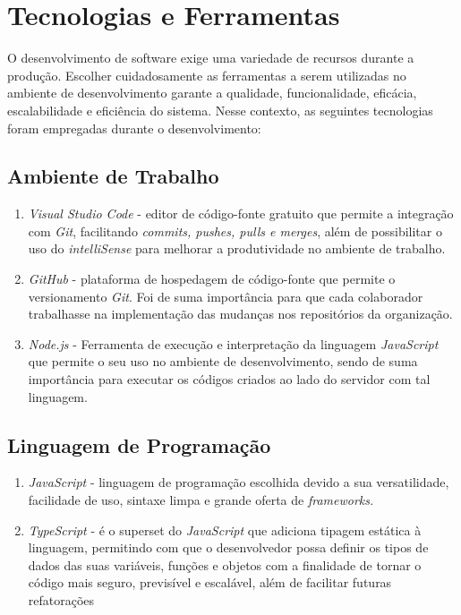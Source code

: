 

\section{Tecnologias e Ferramentas}

O desenvolvimento de software exige uma variedade de recursos durante a produção. Escolher cuidadosamente as ferramentas a serem utilizadas no ambiente de desenvolvimento garante a qualidade, funcionalidade, eficácia, escalabilidade e eficiência do sistema. Nesse contexto, as seguintes tecnologias foram empregadas durante o desenvolvimento: 

\subsection{Ambiente de Trabalho}

\begin{enumerate}
	\item\textit{ Visual Studio Code} - editor de código-fonte gratuito que permite a integração com \textit{Git}, facilitando \textit{commits, pushes, pulls e merges}, além de possibilitar o uso do \textit{intelliSense} para melhorar a produtividade no ambiente de trabalho.
	
	\item \textit{GitHub} -  plataforma de hospedagem de código-fonte que permite o versionamento \textit{ Git}. Foi de suma importância para que cada colaborador trabalhasse na implementação das mudanças nos repositórios da organização.
	
	\item \textit{Node.js} -  Ferramenta de execução e interpretação da linguagem \textit{JavaScript} que permite o seu uso no ambiente de desenvolvimento, sendo de suma importância para executar os códigos criados ao lado do servidor com tal linguagem. 
\end{enumerate}


\subsection{Linguagem de Programação}

\begin{enumerate}
	\item \textit{JavaScript} -   linguagem de programação escolhida devido a sua  versatilidade, facilidade de uso, sintaxe limpa e grande oferta de \textit{frameworks.}
	\item \textit{TypeScript} - é o superset do \textit{JavaScript} que adiciona tipagem estática à linguagem,  permitindo com que o desenvolvedor possa definir os tipos de dados das suas variáveis, funções e objetos com a finalidade de tornar o código mais seguro, previsível e escalável, além de facilitar futuras refatorações

\end{enumerate}

